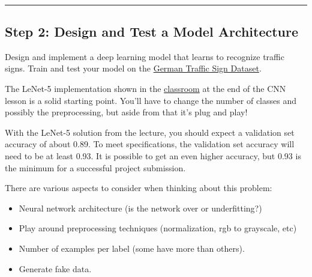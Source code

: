 \documentclass[11pt]{article}
\providecommand{\tightlist}{%
      \setlength{\itemsep}{0pt}\setlength{\parskip}{0pt}}
\begin{document}
    \begin{center}
    \end{center}
    { \hspace*{\fill} \\}
    
    \begin{center}\rule{0.5\linewidth}{\linethickness}\end{center}

\hypertarget{step-2-design-and-test-a-model-architecture}{%
\subsection{Step 2: Design and Test a Model
Architecture}\label{step-2-design-and-test-a-model-architecture}}

Design and implement a deep learning model that learns to recognize
traffic signs. Train and test your model on the
\href{http://benchmark.ini.rub.de/?section=gtsrb\&subsection=dataset}{German
Traffic Sign Dataset}.

The LeNet-5 implementation shown in the
\href{https://classroom.udacity.com/nanodegrees/nd013/parts/fbf77062-5703-404e-b60c-95b78b2f3f9e/modules/6df7ae49-c61c-4bb2-a23e-6527e69209ec/lessons/601ae704-1035-4287-8b11-e2c2716217ad/concepts/d4aca031-508f-4e0b-b493-e7b706120f81}{classroom}
at the end of the CNN lesson is a solid starting point. You'll have to
change the number of classes and possibly the preprocessing, but aside
from that it's plug and play!

With the LeNet-5 solution from the lecture, you should expect a
validation set accuracy of about 0.89. To meet specifications, the
validation set accuracy will need to be at least 0.93. It is possible to
get an even higher accuracy, but 0.93 is the minimum for a successful
project submission.

There are various aspects to consider when thinking about this problem:

\begin{itemize}
\tightlist
\item
  Neural network architecture (is the network over or underfitting?)
\item
  Play around preprocessing techniques (normalization, rgb to grayscale,
  etc)
\item
  Number of examples per label (some have more than others).
\item
  Generate fake data.
\end{itemize}
\end{document}
